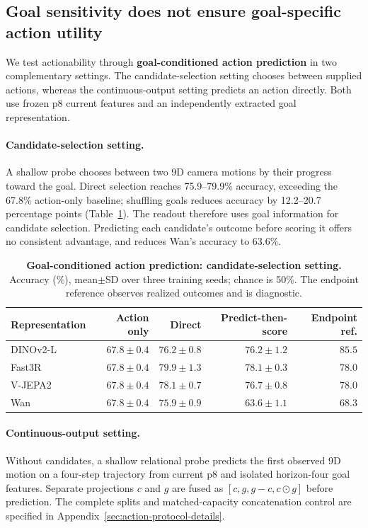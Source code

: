 \documentclass{article} %
\begin{document}
\subsection{Goal sensitivity does not ensure goal-specific action utility}
\label{sec:action-output}
We test actionability through \textbf{goal-conditioned action prediction} in
two complementary settings. The candidate-selection setting chooses between
supplied actions, whereas the continuous-output setting predicts an action
directly. Both use frozen p8 current features and an independently extracted
goal representation.

\paragraph{Candidate-selection setting.}
A shallow probe chooses between two 9D camera motions by their
progress toward the goal. Direct selection reaches 75.9--79.9\% accuracy,
exceeding the 67.8\% action-only baseline; shuffling goals reduces accuracy
by 12.2--20.7 percentage points (Table~\ref{tab:action-output}). The
readout therefore uses goal information for candidate selection.
Predicting each candidate's outcome before scoring it offers no consistent
advantage, and reduces Wan's accuracy to 63.6\%.

\begin{table}[tbp]
  \centering
  \caption{\textbf{Goal-conditioned action prediction: candidate-selection setting.}
  Accuracy (\%), mean$\pm$SD over three training seeds; chance is 50\%.
  The endpoint reference observes realized outcomes and is diagnostic.}
  \label{tab:action-output}
  \footnotesize
  \begin{tabular}{@{}lrrrr@{}}
    \toprule
    \rowcolor{morandiheader}
    Representation & Action only & Direct & Predict-then-score & Endpoint ref. \\
    \midrule
    DINOv2-L & $67.8{\pm}0.4$ & $76.2{\pm}0.8$ & $76.2{\pm}1.2$ & $85.5$ \\
    Fast3R   & $67.8{\pm}0.4$ & $79.9{\pm}1.3$ & $78.1{\pm}0.3$ & $78.0$ \\
    V-JEPA2  & $67.8{\pm}0.4$ & $78.1{\pm}0.7$ & $76.7{\pm}0.8$ & $78.0$ \\
    Wan      & $67.8{\pm}0.4$ & $75.9{\pm}0.9$ & $63.6{\pm}1.1$ & $68.3$ \\
    \bottomrule
  \end{tabular}
\end{table}

\paragraph{Continuous-output setting.}
Without candidates, a shallow relational probe predicts the first observed
9D motion on a four-step trajectory from current p8 and isolated horizon-four
goal features. Separate projections $c$ and $g$ are fused as
$[c,g,g-c,c\odot g]$ before prediction. The complete splits and matched-capacity concatenation control are specified in
Appendix~\ref{sec:action-protocol-details}.
\end{document}
